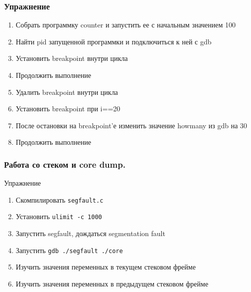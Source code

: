 \begin{frame}
  \frametitle{Упражнение}
  \begin{enumerate}
    \item Собрать программку counter и запустить ее с начальным значением 100
    \item Найти pid запущенной программки и подключиться к ней с gdb
    \item Установить breakpoint внутри цикла
    \item Продолжить выполнение
    \item Удалить breakpoint внутри цикла
    \item Установить breakpoint при i==20
    \item После остановки на breakpoint'е изменить значение howmany из gdb на 30
    \item Продолжить выполнение
  \end{enumerate}
\end{frame}

\begin{frame}
  \frametitle{Работа со стеком и core dump.}
  \begin{center}
    Упражнение
  \end{center}
  \begin{enumerate}
   \item Скомпилировать \texttt{segfault.c}
   \item Установить \texttt{ulimit -c 1000}
   \item Запустить segfault, дождаться segmentation fault
   \item Запустить \texttt{gdb ./segfault ./core}
   \item Изучить значения переменных в текущем стековом фрейме
   \item Изучить значения переменных в предыдущем стековом фрейме
  \end{enumerate}
\end{frame}




